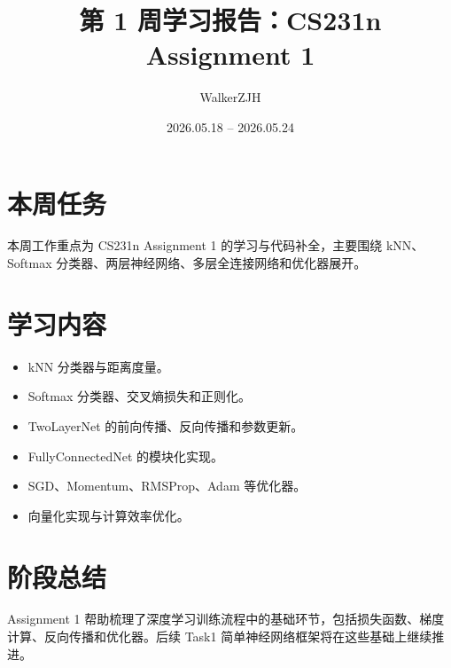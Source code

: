 \documentclass[UTF8]{ctexart}
\title{第 1 周学习报告：CS231n Assignment 1}
\author{WalkerZJH}
\date{2026.05.18 -- 2026.05.24}
\begin{document}
\maketitle

\section{本周任务}

本周工作重点为 CS231n Assignment 1 的学习与代码补全，主要围绕 kNN、Softmax 分类器、两层神经网络、多层全连接网络和优化器展开。

\section{学习内容}

\begin{itemize}
  \item kNN 分类器与距离度量。
  \item Softmax 分类器、交叉熵损失和正则化。
  \item TwoLayerNet 的前向传播、反向传播和参数更新。
  \item FullyConnectedNet 的模块化实现。
  \item SGD、Momentum、RMSProp、Adam 等优化器。
  \item 向量化实现与计算效率优化。
\end{itemize}

\section{阶段总结}

Assignment 1 帮助梳理了深度学习训练流程中的基础环节，包括损失函数、梯度计算、反向传播和优化器。后续 Task1 简单神经网络框架将在这些基础上继续推进。
\end{document}
